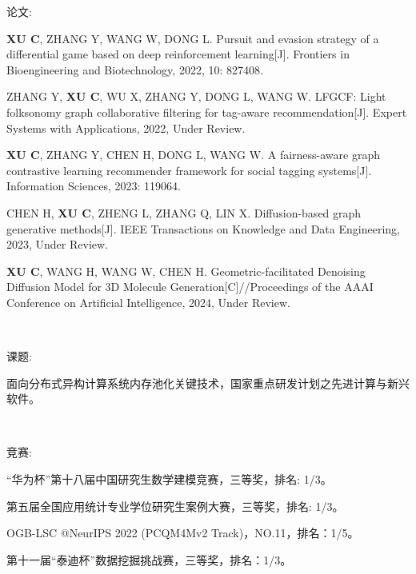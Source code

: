 \newpage
\pagestyle{fancy}
\begin{center}
\heiti{}
\end{center}


论文:

\textbf{XU C}, ZHANG Y, WANG W, DONG L. Pursuit and evasion strategy of a differential game based on deep reinforcement learning[J]. Frontiers in Bioengineering and Biotechnology, 2022, 10: 827408.

ZHANG Y, \textbf{XU C}, WU X, ZHANG Y, DONG L, WANG W. LFGCF: Light folksonomy graph collaborative filtering for tag-aware recommendation[J]. Expert Systems with Applications, 2022, Under Review.

\textbf{XU C}, ZHANG Y, CHEN H, DONG L, WANG W. A fairness-aware graph contrastive learning recommender framework for social tagging systems[J]. Information Sciences, 2023: 119064.

CHEN H, \textbf{XU C}, ZHENG L, ZHANG Q, LIN X. Diffusion-based graph generative methods[J]. IEEE Transactions on Knowledge and Data Engineering, 2023, Under Review.

\textbf{XU C}, WANG H, WANG W, CHEN H. Geometric-facilitated Denoising Diffusion Model for 3D Molecule Generation[C]//Proceedings of the AAAI Conference on Artificial Intelligence, 2024, Under Review.

\

课题:

面向分布式异构计算系统内存池化关键技术，国家重点研发计划之先进计算与新兴软件。


\

竞赛:

“华为杯”第十八届中国研究生数学建模竞赛，三等奖，排名: 1/3。

第五届全国应用统计专业学位研究生案例大赛，三等奖，排名: 1/3。

OGB-LSC @NeurIPS 2022 (PCQM4Mv2 Track)，NO.11，排名：1/5。

第十一届“泰迪杯”数据挖掘挑战赛，三等奖，排名：1/3。